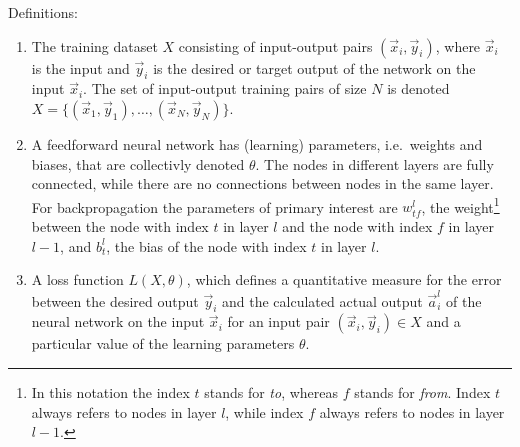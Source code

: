 Definitions:
\begin{enumerate}
    \item The training dataset $X$ consisting of input-output pairs $(\vec{x}_i,
    \vec{y}_i)$, where $\vec{x}_i$ is the input and $\vec{y}_i$ is the desired or target
    output of the network on the input $\vec{x}_i$. The set of input-output training pairs
    of size $N$ is denoted $X = \{(\vec{x}_1,\vec{y}_1), \dots, (\vec{x}_N,\vec{y}_N)\}$.

    \item A feedforward neural network has (learning) parameters, i.e.\ weights and
    biases, that are collectivly denoted $\theta$. The nodes in different layers are fully
    connected, while there are no connections between nodes in the same layer. For
    backpropagation the parameters of primary interest are $w^l_{tf}$, the
    weight\footnote{In this notation the index $t$ stands for \emph{to}, whereas $f$
    stands for \emph{from}. Index $t$ always refers to nodes in layer $l$, while index $f$
    always refers to nodes in layer $l-1$.} between the node with index $t$ in layer $l$
    and the node with index $f$ in layer $l-1$, and $b^l_t$, the bias of the node with
    index $t$ in layer $l$. 

    \item A loss function $L(X,\theta)$, which defines a quantitative measure for the
    error between the desired output $\vec{y}_i$ and the calculated actual output
    $\vec{a}^l_i$ of the neural network on the input $\vec{x}_i$ for an input pair
    $(\vec{x}_i, \vec{y}_i) \in X$ and a particular value of the learning parameters
    $\theta$.
\end{enumerate}

